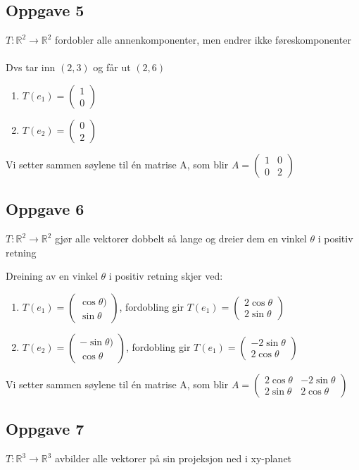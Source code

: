 \documentclass{article}
\newcommand{\vect}[1]{\begin{pmatrix} #1 \end{pmatrix}}
\begin{document}
\newpage
\subsection*{Oppgave 5}
\(T : \mathbb{R}^2 \rightarrow \mathbb{R}^2\) fordobler alle annenkomponenter, men endrer ikke føreskomponenter \\\\
Dvs tar inn $(2, 3)$ og får ut $(2, 6)$

\begin{enumerate}[]
    \item $T(e_1) = \vect{1 \\ 0}$
    \item $T(e_2) = \vect{0 \\ 2}$
\end{enumerate}
Vi setter sammen søylene til én matrise A, som blir \underline{\underline{\(A = \begin{pmatrix}
    1 & 0 \\ 0 & 2
\end{pmatrix}\)}}

\subsection*{Oppgave 6}
\(T : \mathbb{R}^2 \rightarrow \mathbb{R}^2\) gjør alle vektorer dobbelt så lange og dreier dem en vinkel $\theta$ i positiv retning

Dreining av en vinkel $\theta$ i positiv retning skjer ved:
\begin{enumerate}[]
    \item \(T(e_1) = \vect{\cos{\theta}) \\ \sin{\theta}}\), fordobling gir \(T(e_1) = \vect{2\cos{\theta} \\ 2\sin{\theta}}\)
    \item \(T(e_2) = \vect{-\sin{\theta}) \\ \cos{\theta}}\), fordobling gir \(T(e_1) = \vect{-2\sin{\theta} \\ 2\cos{\theta}}\)
\end{enumerate}
Vi setter sammen søylene til én matrise A, som blir \underline{\underline{$A = \begin{pmatrix}
    2\cos{\theta} & -2\sin{\theta} \\ 2\sin{\theta} & 2\cos{\theta}
\end{pmatrix}$}}

\subsection*{Oppgave 7}
\(T : \mathbb{R}^3 \rightarrow \mathbb{R}^3\) avbilder alle vektorer på sin projeksjon ned i xy-planet \\\\
\end{document}
